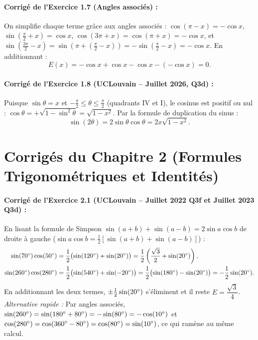 \paragraph{Corrigé de l'Exercice 1.7 (Angles associés) :}
On simplifie chaque terme grâce aux angles associés : $\cos(\pi-x) = -\cos x$, $\sin\left(\frac{\pi}{2}+x\right) = \cos x$, $\cos(3\pi+x) = \cos(\pi+x) = -\cos x$, et $\sin\left(\frac{3\pi}{2}-x\right) = \sin\left(\pi + \left(\frac{\pi}{2}-x\right)\right) = -\sin\left(\frac{\pi}{2}-x\right) = -\cos x$. En additionnant :
\[
    E(x) = -\cos x + \cos x - \cos x - (-\cos x) = \boxed{0}.
\]

\paragraph{Corrigé de l'Exercice 1.8 (UCLouvain -- Juillet 2026, Q3d) :}
Puisque $\sin\theta = x$ et $-\frac{\pi}{2} \le \theta \le \frac{\pi}{2}$ (quadrants IV et I), le cosinus est positif ou nul : $\cos\theta = +\sqrt{1 - \sin^2\theta} = \sqrt{1 - x^2}$. Par la formule de duplication du sinus :
\[
    \sin(2\theta) = 2\sin\theta\cos\theta = \boxed{2x\sqrt{1 - x^2}}.
\]

\section{Corrigés du Chapitre 2 (Formules Trigonométriques et Identités)}

\paragraph{Corrigé de l'Exercice 2.1 (UCLouvain -- Juillet 2022 Q3f et Juillet 2023 Q3d) :}
En lisant la formule de Simpson $\sin(a+b) + \sin(a-b) = 2\sin a \cos b$ de droite à gauche ($\sin a\cos b = \frac{1}{2}[\sin(a+b) + \sin(a-b)]$) :
\begin{align*}
    \sin(70\degree)\cos(50\degree) &= \frac{1}{2}\bigl(\sin(120\degree) + \sin(20\degree)\bigr) = \frac{1}{2}\left(\frac{\sqrt{3}}{2} + \sin(20\degree)\right), \\
    \sin(260\degree)\cos(280\degree) &= \frac{1}{2}\bigl(\sin(540\degree) + \sin(-20\degree)\bigr) = \frac{1}{2}\bigl(\sin(180\degree) - \sin(20\degree)\bigr) = -\frac{1}{2}\sin(20\degree).
\end{align*}
En additionnant les deux termes, $\pm\frac{1}{2}\sin(20\degree)$ s'éliminent et il reste $E = \boxed{\dfrac{\sqrt{3}}{4}}$.
\emph{Alternative rapide :} Par angles associés, $\sin(260\degree) = \sin(180\degree+80\degree) = -\sin(80\degree) = -\cos(10\degree)$ et $\cos(280\degree) = \cos(360\degree-80\degree) = \cos(80\degree) = \sin(10\degree)$, ce qui ramène au même calcul.

